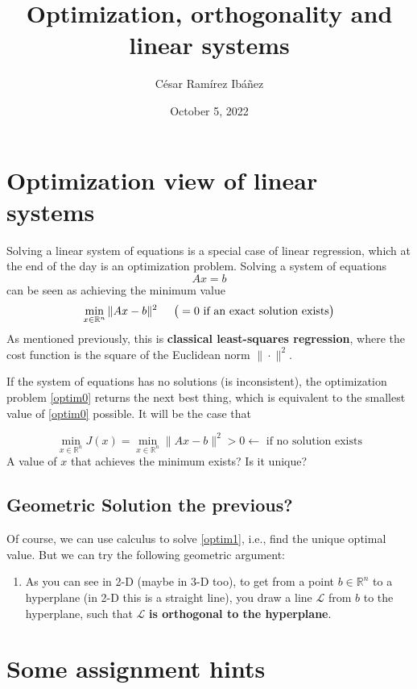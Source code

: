 \documentclass[12pt]{article}
\title{Optimization, orthogonality and linear systems}
\author{C\'{e}sar Ram\'{i}rez Ib\'{a}\~{n}ez  }
\date{October 5, 2022 }
\theoremstyle{definition}
\begin{document}
\section{Optimization view of linear systems}
Solving a linear system of equations is a special case of linear regression, which at the end of the day is an optimization problem. Solving a system of equations $$Ax=b$$ can be seen as achieving the minimum value
\begin{equation}\label{optim0}
\min_{x\in\mathbb{R}^n} \|Ax-b\|^2 \hspace{0.2in}\big(=0 \text{ if an exact solution exists} \big)
\end{equation}
As mentioned previously, this is \textbf{classical least-squares regression}, where the cost function is the square of the Euclidean norm $\|\cdot\|^2$. 

If the system of equations has no solutions (is inconsistent), the optimization problem \eqref{optim0} returns the next best thing, which is equivalent to the smallest value of \eqref{optim0} possible. It will be the case that

\begin{equation}\label{optim1}
\min_{x\in\mathbb{R}^n} J(x)=
\min_{x\in\mathbb{R}^n} \|Ax-b\|^2 >0 \leftarrow\text{ if no solution exists}
\end{equation}
A value of $x$ that achieves the minimum exists? Is it unique?   


\subsection{Geometric Solution the previous?}
Of course, we can use calculus to solve \eqref{optim1}, i.e., find the unique optimal value. But we can try the following geometric argument:
\begin{enumerate}
\item As you can see in 2-D (maybe in 3-D too), to get from a point $b\in\mathbb{R}^n$ to a hyperplane (in 2-D this is a straight line), you draw a line $\mathcal{L}$ from $b$ to the hyperplane, such that $\mathcal{L}$\textbf{ is orthogonal to the hyperplane}. 

\end{enumerate} 












\section{Some assignment hints}
\end{document}
